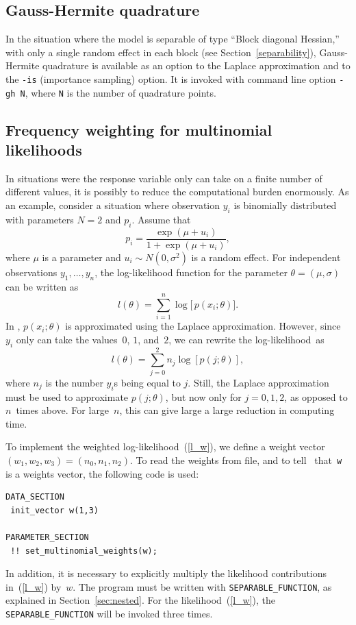 \documentclass{admbmanual}
\begin{document}
\subsection{Gauss-Hermite quadrature}

In the situation where the model is separable of type ``Block diagonal
Hessian,'' with only a single random effect in each block (see
Section~\ref{separability}), Gauss-Hermite quadrature is available as an option
to the Laplace approximation and to the \texttt{-is} (importance sampling)
option. It is invoked with command line option \texttt{-gh N}, where \texttt{N}
is the number of quadrature points.

\subsection{Frequency weighting for multinomial likelihoods}

In situations were the response variable only can take on a finite number of
different values, it is possibly to reduce the computational burden enormously.
As an example, consider a situation where observation $y_{i}$ is binomially
distributed with parameters $N=2$ and $p_{i}$. Assume that
\begin{equation*}
  p_{i}=\frac{\exp (\mu +u_{i})}{1+\exp (\mu +u_{i})},
\end{equation*}
where $\mu$ is a parameter and $u_{i}\sim N(0,\sigma ^{2})$ is a random effect.
For independent observations $y_1,\ldots,y_n$, the log-likelihood function for
the parameter $\theta =(\mu ,\sigma )$ can be written as
\begin{equation}
  l(\theta )=\sum_{i=1}^{n}\log \bigl[\, p(x_{i};\theta )\bigr] .
\end{equation}
In \scAR, $p(x_{i};\theta)$ is approximated using the Laplace approximation.
However, since $y_i$ only can take the values~$0$, $1$, and~$2$, we can rewrite
the log-likelihood~as
$$
l(\theta )=\sum_{j=0}^{2}n_{j}\log \left[ p(j;\theta )\right],
$$
where $n_j$ is the number $y_i$s being equal to $j$. Still, the Laplace
approximation must be used to approximate $p(j;\theta )$, but now only for
$j=0,1,2$, as opposed to $n$~times above. For large~$n$, this can give large a
large reduction in computing time.

To implement the weighted log-likelihood~(\ref{l_w}), we define a weight vector
$(w_1,w_2,w_3)=(n_{0},n_{1},n_{2})$. To read the weights from file, and to tell
\scAR\ that~\texttt{w} is a weights vector, the following code is used:
\begin{lstlisting}
DATA_SECTION
 init_vector w(1,3)

PARAMETER_SECTION
 !! set_multinomial_weights(w);
\end{lstlisting}
In addition, it is necessary to explicitly multiply the likelihood contributions
in~(\ref{l_w}) by~$w$. The program must be written with
\texttt{SEPARABLE\_FUNCTION}, as explained in Section~\ref{sec:nested}. For the
likelihood~(\ref{l_w}), the \texttt{SEPARABLE\_FUNCTION} will be invoked three
times.
\end{document}
